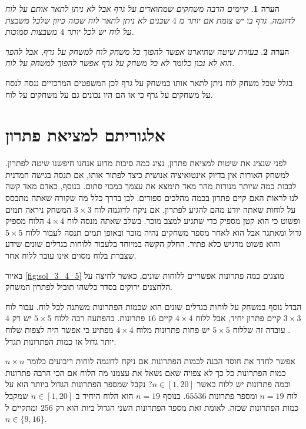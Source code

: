 \documentclass[12pt,leqno]{article}
\newtheorem{comm}{הערה}[section]
\begin{document}
\begin{comm}
    קיימים הרבה משחקים שמתוארים על גרף אבל לא ניתן לתאר אותם על לוח
    לדוגמה,
    גרף בו יש צומת אם יותר מ
    $4$
    שכנים לא ניתן לתאר לוח שכזה כיוון שלכל משבצת על לוח
    יש לכל יותר 
    $4$
    משבצות סמוכות.
\end{comm}

\begin{comm}
    בעזרת שיטה שתיארנו אפשר להפוך כל משחק לוח למשחק על גרף, אבל להפך הוא לא נכון 
    כלומר לא כל משחק על גרף אפשר להפוך למשחק על לוח.
\end{comm}

בגלל שכל משחק לוח ניתן לתאר אותו כמשחק על גרף לכן המשפטים המרכזיים ננסה לנסח על משחקים על גרף כי אז הם היו נכונים
גם על משחקים על לוח.


\newpage

\section{ אלגוריתם למציאת פתרון}

לפני שנציג את שיטות למציאת פתרון, נציג כמה סיבות מדוע אנחנו חיפשנו שיטה
לפתרון.
למשחק האורות אין בדיוק אינטואיציה אנושית כיצד לפתור אותו,
אם תנסה בגישה חמדנית לכבות כמה שיותר מנורות מהר מאד תימצא את עצמך במבוי סתום.
בנוסף,
כאדם מאד קשה לנו לראות האם קיים פתרון בכמה מהלכים ספורים. 
לכן בדרך כלל מה שקורה שאתה מתבסס על לוחות שאתה יודע מהם להגיע לפתרון.
אם ניקח לדוגמה לוח 
$3 \times 3$
המשחק ניראה תמים ופשוט כי הוא קטן מספיק כדי שתגיע למצב מוכר. בשלב שאתה מנסה לוח 
$4 \times 4$
הלוח
מספיק גדול ומאתגר
אבל הוא לאחר מספר משחקים נהיה מוכר ובאופן תמים תנסה לעבור ללוח
$5 \times 5$
והוא פשוט מרגיש כלא פתיר.
החלק הקשה במיוחד בלעבור ללוחות בגדלים שונים  שידע 
שצברת בלוח מסוים אינו עובר ללוח אחר.

באיור
\ref{fig:sol_3_4_5}
מוצגים כמה פתרונות אפשריים ללוחות שונים, כאשר לחיצה על הלחצנים ירוקים
בסדר כלשהו תוביל לפתרון המשחק.

הבדל נוסף במשחק על לוחות בגדלים שונים הוא שכמות הפתרונות משתנה לכל לוח.
עבור לוח 
$3 \times 3$
קיים פתרון יחיד,
אבל ללוח 
$4 \times 4$
קיים
$16$
פתרונות.
בהפתעה רבה ללוח 
$5 \times 5$
יש רק 
$4$.
עובדה זה שללוח 
$5 \times 5$
יש פחות פתרונות מלוח 
$4 \times 4$
מפתיע כי אפשר היה לצפות שלוח יותר גדול אז כמות הפתרונות תגדל.

אפשר לחדד את חוסר הבנה לכמות הפתרונות אם ניקח לדוגמה לוחות ריבועים כלומר
$n \times n$
כמות הפתרונות כל כך לא צפויה
שאם נשאל את עצמנו מה הלוח אם הכי הרבה פתרונות וכמה פתרונות יש ללוח כאשר 
$n \in [1,20]$?
נקבל שמספר הפתרונות הגדול ביותר הוא על לוח
$n = 19$ 
ומספר פתרונות 
$65536$.
בנוסף
$n = 19$ 
הוא הלוח היחיד ב
$n \in [1,20]$
שמקבל
כמות הפתרונות שכזה.
לאומת זאת
מספר הפתרונות השני הגדול ביות הוא רק
$256$
ומתקיים ל
$n \in \{9, 16 \}$.
\end{document}
